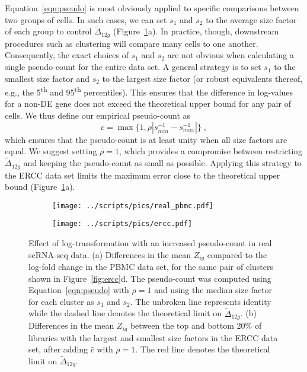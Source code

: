\documentclass[10pt,letterpaper]{article}
\begin{document}
Equation~\ref{eqn:pseudo} is most obviously applied to specific comparisons between two groups of cells.
In such cases, we can set $s_1$ and $s_2$ to the average size factor of each group to control $\tilde\Delta_{12g}$ (Figure~\ref{fig:bigreal}a).
In practice, though, downstream procedures such as clustering will compare many cells to one another.
Consequently, the exact choices of $s_1$ and $s_2$ are not obvious when calculating a single pseudo-count for the entire data set.
A general strategy is to set $s_1$ to the smallest size factor and $s_2$ to the largest size factor
(or robust equivalents thereof, e.g., the 5\textsuperscript{th} and 95\textsuperscript{th} percentiles).
This ensures that the difference in log-values for a non-DE gene does not exceed the theoretical upper bound for any pair of cells.
We thus define our empirical pseudo-count as
\[
\hat c = \max\{1, \rho |s_{min}^{-1} - s_{max}^{-1}|\} \;,
\]
which ensures that the pseudo-count is at least unity when all size factors are equal.
We suggest setting $\rho=1$, which provides a compromise between restricting $\tilde\Delta_{12g}$ and keeping the pseudo-count as small as possible.
Applying this strategy to the ERCC data set limits the maximum error close to the theoretical upper bound (Figure~\ref{fig:bigreal}a).

\begin{figure}[btp]
\centering
\begin{subfigure}[b]{0.49\textwidth}
    \texttt{[image: ../scripts/pics/real\_pbmc.pdf]}
    \caption{}
\end{subfigure}
\begin{subfigure}[b]{0.49\textwidth}
    \texttt{[image: ../scripts/pics/ercc.pdf]}
    \caption{}
\end{subfigure}
\caption{Effect of log-transformation with an increased pseudo-count in real scRNA-seq data.
(a) Differences in the mean $Z_{ig}$ compared to the log-fold change in the PBMC data set, for the same pair of clusters shown in Figure~\ref{fig:ercc}d.
The pseudo-count was computed using Equation~\ref{eqn:pseudo} with $\rho=1$ and using the median size factor for each cluster as $s_1$ and $s_2$.
The unbroken line represents identity while the dashed line denotes the theoretical limit on $\tilde \Delta_{12g}$.
(b) Differences in the mean $Z_{ig}$ between the top and bottom 20\% of libraries with the largest and smallest size factors in the ERCC data set, after adding $\hat c$ with $\rho =1$.
The red line denotes the theoretical limit on $\tilde \Delta_{12g}$.
}
\label{fig:bigreal}
\end{figure}
\end{document}
